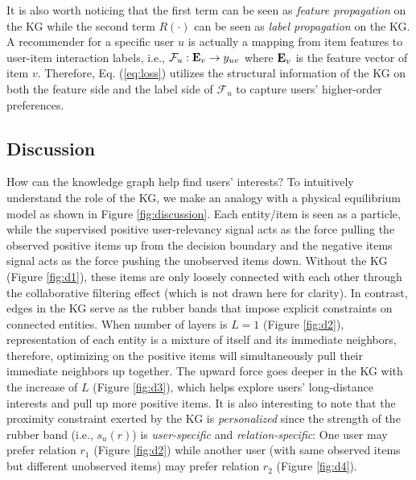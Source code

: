 \documentclass[sigconf]{acmart}
\begin{document}
		It is also worth noticing that the first term can be seen as \textit{feature propagation} on the KG while the second term $R(\cdot)$ can be seen as \textit{label propagation} on the KG.
		A recommender for a specific user $u$ is actually a mapping from item features to user-item interaction labels, i.e., $\mathcal F_u: {\bf E}_v \rightarrow y_{uv}$ where ${\bf E}_v$ is the feature vector of item $v$.
		Therefore, Eq. (\ref{eq:loss}) utilizes the structural information of the KG on both the feature side and the label side of $\mathcal F_u$ to capture users' higher-order preferences.



\subsection{Discussion}
	\label{sec:discussion}
		How can the knowledge graph help find users' interests?
		To intuitively understand the role of the KG, we make an analogy with a physical equilibrium model as shown in Figure \ref{fig:discussion}.
		Each entity/item is seen as a particle, while the supervised positive user-relevancy signal acts as the force pulling the observed positive items up from the decision boundary and the negative items signal acts as the force pushing the unobserved items down.
		Without the KG (Figure \ref{fig:d1}), these items are only loosely connected with each other through the collaborative filtering effect (which is not drawn here for clarity).
		In contrast, edges in the KG serve as the rubber bands that impose explicit constraints on connected entities.
		When number of layers is $L=1$ (Figure \ref{fig:d2}), representation of each entity is a mixture of itself and its immediate neighbors, therefore, optimizing on the positive items will simultaneously pull their immediate neighbors up together.
		The upward force goes deeper in the KG with the increase of $L$ (Figure \ref{fig:d3}), which helps explore users' long-distance interests and pull up more positive items.
		It is also interesting to note that the proximity constraint exerted by the KG is \textit{personalized} since the strength of the rubber band (i.e., $s_u(r)$) is \textit{user-specific} and \textit{relation-specific}:
		One user may prefer relation $r_1$ (Figure \ref{fig:d2}) while another user (with same observed items but different unobserved items) may prefer relation $r_2$ (Figure \ref{fig:d4}).
		
\end{document}

